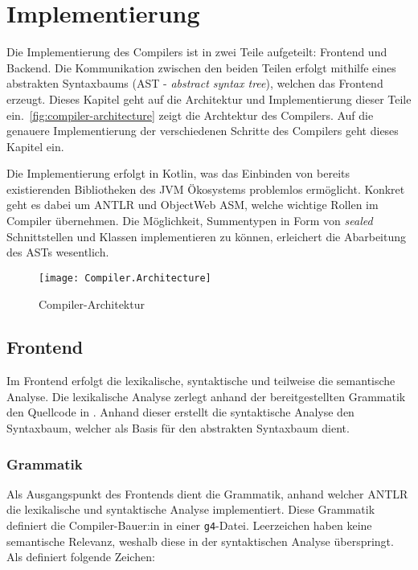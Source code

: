 \chapter{Implementierung}
\label{cha:implementation}

Die Implementierung des Compilers ist in zwei Teile aufgeteilt: Frontend und Backend. Die Kommunikation zwischen den beiden Teilen erfolgt mithilfe eines abstrakten Syntaxbaums (AST - \textit{abstract syntax tree}), welchen das Frontend erzeugt. Dieses Kapitel geht  auf die Architektur und Implementierung dieser Teile ein.~\autoref{fig:compiler-architecture} zeigt die Archtektur des \toya Compilers. Auf die genauere Implementierung der verschiedenen Schritte des Compilers geht dieses Kapitel ein.

Die Implementierung erfolgt in Kotlin, was das Einbinden von bereits existierenden Bibliotheken des JVM Ökosystems problemlos ermöglicht. Konkret geht es dabei um ANTLR und ObjectWeb ASM, welche wichtige Rollen im Compiler übernehmen. Die Möglichkeit, Summentypen in Form von \textit{sealed} Schnittstellen und Klassen implementieren zu können, erleichert die Abarbeitung des ASTs wesentlich.

\begin{figure}[h]
    \caption{Compiler-Architektur}
    \centering
    \texttt{[image: Compiler.Architecture]}
    \label{fig:compiler-architecture}
\end{figure}

\section{Frontend}

Im Frontend erfolgt die lexikalische, syntaktische und teilweise die semantische Analyse. Die lexikalische Analyse zerlegt anhand der bereitgestellten Grammatik den Quellcode in \token. Anhand dieser \token erstellt die syntaktische Analyse den Syntaxbaum, welcher als Basis für den abstrakten Syntaxbaum dient.

\subsection{Grammatik}

Als Ausgangspunkt des Frontends dient die Grammatik, anhand welcher ANTLR die lexikalische und syntaktische Analyse implementiert. Diese Grammatik definiert die Compiler-Bauer:in in einer \texttt{g4}-Datei. Leerzeichen haben keine semantische Relevanz, weshalb \toya diese in der syntaktischen Analyse überspringt. Als \token definiert \toya folgende Zeichen:

